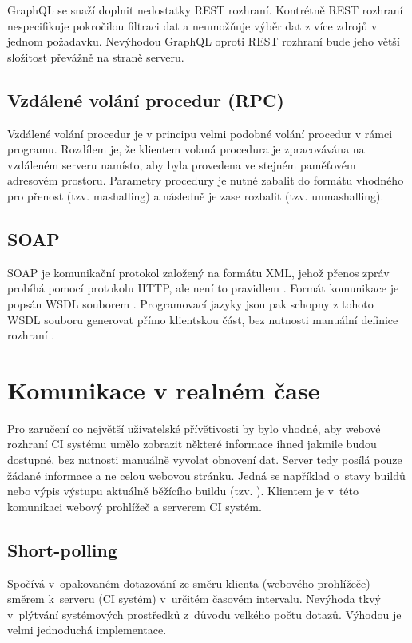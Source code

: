 GraphQL se snaží doplnit nedostatky REST rozhraní.
Kontrétně REST rozhraní nespecifikuje pokročilou filtraci dat a neumožňuje výběr dat z více zdrojů v jednom požadavku.
Nevýhodou GraphQL oproti REST rozhraní bude jeho větší složitost převážně na straně serveru.
\cite{graphql}

\subsection{Vzdálené volání procedur (RPC)}

Vzdálené volání procedur je v principu velmi podobné volání procedur v rámci programu.
Rozdílem je, že klientem volaná procedura je zpracovávána na vzdáleném serveru namísto, aby byla provedena ve stejném paměťovém adresovém prostoru.
Parametry procedury je nutné zabalit do formátu vhodného pro přenost (tzv. mashalling) a následně je zase rozbalit (tzv. unmashalling).
\cite{rpc}

\subsection{SOAP}

SOAP je komunikační protokol založený na formátu XML, jehož přenos zpráv probíhá pomocí protokolu HTTP, ale není to pravidlem \cite{soap}.
Formát komunikace je popsán WSDL souborem \cite{wsdl}.
Programovací jazyky jsou pak schopny z tohoto WSDL souboru generovat přímo klientskou část, bez nutnosti manuální definice rozhraní \cite{php_wsdl}.

\section{Komunikace v realném čase}

Pro zaručení co největší uživatelské přívětivosti by bylo vhodné, aby webové rozhraní CI systému umělo zobrazit některé informace ihned jakmile budou dostupné, bez nutnosti manuálně vyvolat obnovení dat.
Server tedy posílá pouze žádané informace a ne celou webovou stránku.
Jedná se například o~stavy buildů nebo výpis výstupu aktuálně běžícího buildu (tzv. ).
Klientem je v~této komunikaci webový prohlížeč a serverem CI systém.

\subsection{Short-polling}

Spočívá v~opakovaném dotazování ze směru klienta (webového prohlížeče) směrem k~serveru (CI systém) v~určitém časovém intervalu.
Nevýhoda tkvý v~plýtvání systémových prostředků z~důvodu velkého počtu dotazů.
Výhodou je velmi jednoduchá implementace.


